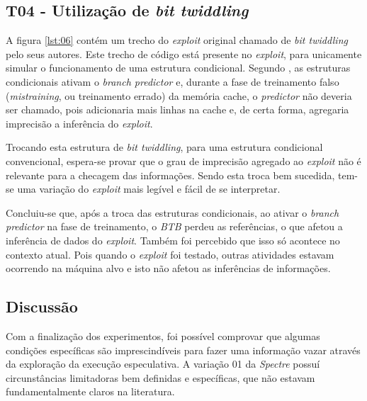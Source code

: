 \documentclass[
	article,			    %
	12pt,				    %
	oneside,			    %
	a4paper,			    %
	chapter=TITLE,		    %
	section=TITLE,		    %
	subsection=TITLE,	    %
	english,			    %
	brazil,				    %
	sumario=tradicional
]{abntex2}
\begin{document}
\begin{comment}
Adicionar uma imagem com as saídas.
\end{comment}

\subsection{T04 - Utilização de \emph{bit twiddling}}
A figura \ref{lst:06} contém um trecho do \emph{exploit} original chamado de \emph{bit twiddling} pelo seus autores. Este trecho de código está presente no \emph{exploit}, para unicamente simular o funcionamento de uma estrutura condicional. Segundo , as estruturas condicionais ativam o \emph{branch predictor} e, durante a fase de treinamento falso (\emph{mistraining}, ou treinamento errado) da memória cache, o \emph{predictor} não deveria ser chamado, pois adicionaria mais linhas na cache e, de certa forma, agregaria imprecisão a inferência do \emph{exploit}.



Trocando esta estrutura de \emph{bit twiddling}, para uma estrutura condicional convencional, espera-se provar que o grau de imprecisão agregado ao \emph{exploit} não é relevante para a checagem das informações. Sendo esta troca bem sucedida, tem-se uma variação do \emph{exploit} mais legível e fácil de se interpretar.

Concluiu-se que, após a troca das estruturas condicionais, ao ativar o \emph{branch predictor} na fase de treinamento, o \emph{BTB} perdeu as referências, o que afetou a inferência de dados do \emph{exploit}. Também foi percebido que isso só acontece no contexto atual. Pois quando o \emph{exploit} foi testado, outras atividades estavam ocorrendo na máquina alvo e isto não afetou as inferências de informações.

\subsection{Discussão}
Com a finalização dos experimentos, foi possível comprovar que algumas condições específicas são imprescindíveis para fazer uma informação vazar através da exploração da execução especulativa. A variação 01 da \emph{Spectre} possuí circunstâncias limitadoras bem definidas e específicas, que não estavam fundamentalmente claros na literatura.
\end{document}

